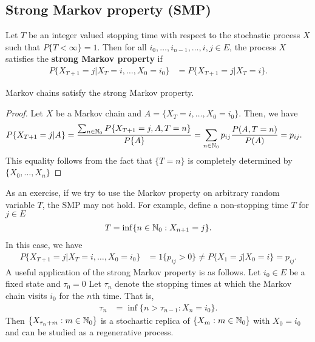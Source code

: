 \documentclass[a4paper,10pt,english]{article}
\begin{document}
\subsection{Strong Markov property (SMP)}
Let $T$ be an integer valued stopping time with respect to the stochastic process $X$ such that $P\{T< \infty\}=1$. 
Then for all $i_0, \dots, i_{n-1},\dots, i,j \in E$, the process $X$ satisfies the \textbf{strong Markov property} if 
\begin{align*}
P\{X_{T+1} = j|X_{T} = i, \dots,X_0 =i_0\} &= P\{X_{T+1} = j|X_{T} = i\}.
\end{align*}
\begin{lem}
Markov chains satisfy the strong Markov property. 
\end{lem}
\begin{proof}
Let $X$ be a Markov chain and $A = \{X_{T} = i, \dots, X_0 =i_0\}$. 
Then, we have 
\begin{align*}
P\{X_{T+1} = j|A\} &=\frac{\sum_{n \in \N_0}P\{X_{T+1}=j, A, T = n\}}{P\{A\}} %
= \sum_{n \in \N_0} p_{ij}\frac{P(A, T =n)}{P(A)} = p_{ij}.
\end{align*}
This equality follows from the fact that $\{T = n\}$ is completely determined by $\{X_0, \dots, X_n\}$
\end{proof}
As an exercise, if we try to use the Markov property on arbitrary random variable $T$, the SMP may not hold. 
For example, define a non-stopping time $T$ for $j \in E$
\begin{align*}
T=\inf \{n \in \mathbb{N}_0: X_{n+1}=j\}.
\end{align*}
In this case, we have 
\begin{align*}
P\{X_{T+1}=j|X_T=i,\dots, X_0 = i_0\}&= 1\{p_{ij} > 0\} \neq  P \{X_1=j |X_0=i\} = p_{ij}.
\end{align*}
A useful application of the strong Markov property is as follows. 
Let $i_0 \in E$ be a fixed state and $\tau_0 = 0$
Let $\tau_n$ denote the stopping times at which the Markov chain visits $i_0$ for the $n$th time. 
That is,
\begin{align*} 
\tau_n &= \inf\{n > \tau_{n-1}: X_n = i_0\}. 
\end{align*}
Then $\{X_{\tau_n + m}: m \in \mathbb{N}_0\}$ is a stochastic replica of $\{X_m: m \in \mathbb{N}_0\}$ with $X_0 = i_0$ and can be studied as a regenerative process. 
\end{document}
